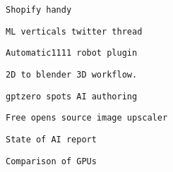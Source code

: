           \protect\hypertarget{ID_1126986439}{}{}

\begin{verbatim}
Shopify handy
\end{verbatim}
         
       

       
       
        \protect\hypertarget{ID_970988604}{}{}

\begin{verbatim}
ML verticals twitter thread
\end{verbatim}
       

       
       
        \protect\hypertarget{ID_1598560866}{}{}

\begin{verbatim}
Automatic1111 robot plugin
\end{verbatim}
       

       
       
        \protect\hypertarget{ID_1846607016}{}{}

\begin{verbatim}
2D to blender 3D workflow.
\end{verbatim}
       

       
       
        \protect\hypertarget{ID_596143043}{}{}

\begin{verbatim}
gptzero spots AI authoring
\end{verbatim}
       

       
       
        \protect\hypertarget{ID_1653882995}{}{}

\begin{verbatim}
Free opens source image upscaler
\end{verbatim}
       

       
       
        \protect\hypertarget{ID_1155414864}{}{}

\begin{verbatim}
State of AI report
\end{verbatim}
       

       
       
        \protect\hypertarget{ID_790807235}{}{}

\begin{verbatim}
Comparison of GPUs
\end{verbatim}
       

